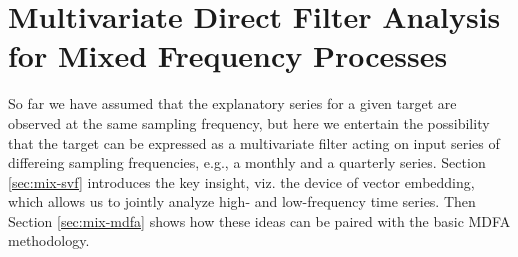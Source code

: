 \documentclass[a4paper]{book}
\begin{document}
% 


 










\chapter{Multivariate Direct Filter Analysis for Mixed Frequency Processes}
\label{chap:mix}

So far we have assumed that the explanatory series for a given target are observed
 at the same sampling frequency, but here we entertain the possibility that
 the target can be expressed as a multivariate filter acting on input series of
differeing sampling frequencies, e.g., a monthly and a quarterly series.
 Section \ref{sec:mix-svf} introduces the key insight, viz. the device of vector
  embedding, which allows us to jointly analyze high- and low-frequency time series.
  Then Section \ref{sec:mix-mdfa} shows how these ideas can be paired with the basic
   MDFA methodology.
 
\end{document}
